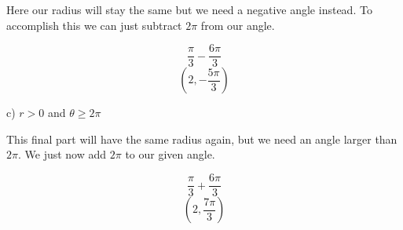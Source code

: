 \begin{solution}
        Here our radius will stay the same but we need a negative angle instead. To accomplish this we can just subtract $2\pi$ from our angle. 
        
        \[\frac{\pi}{3} - \frac{6\pi}{3}\]
        \[\boxed{\left( 2, -\frac{5\pi}{3} \right)}\]
        
    c) $r > 0$ and $\theta \geq 2\pi$ \medskip
        
        This final part will have the same radius again, but we need an angle larger than $2\pi$. We just now add $2\pi$ to our given angle. 
        
        \[\frac{\pi}{3} + \frac{6\pi}{3}\]
        \[\boxed{ \left( 2, \frac{7\pi}{3} \right)  }\]
\end{solution}